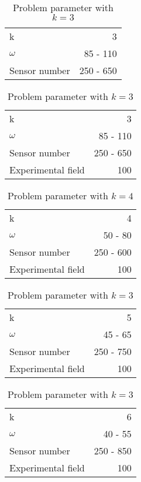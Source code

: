\begin{table}[h!]
	\centering
	\begin{tabular}{l | r}
		k & 3 \\
		$\omega$ & 85 - 110 \\
		Sensor number & 250 - 650 \\
	\end{tabular}
	\caption{Problem parameter with $k = 3$}
\end{table}

\begin{table}[h!]
	\centering
	\begin{tabular}{l | r}
		k & 3 \\
		$\omega$ & 85 - 110 \\
		Sensor number & 250 - 650 \\
		Experimental field & 100
	\end{tabular}
	\caption{Problem parameter with $k = 3$}
\end{table}

\begin{table}[h!]
	\centering
	\begin{tabular}{l | r}
		k & 4 \\
		$\omega$ & 50 - 80 \\
		Sensor number & 250 - 600 \\
		Experimental field & 100
	\end{tabular}
	\caption{Problem parameter with $k = 4$}
\end{table}

\begin{table}[h!]
	\centering
	\begin{tabular}{l | r}
		k & 5 \\
		$\omega$ & 45 - 65 \\
		Sensor number & 250 - 750 \\
		Experimental field & 100
	\end{tabular}
	\caption{Problem parameter with $k = 3$}
\end{table}

\begin{table}[h!]
	\centering
	\begin{tabular}{l | r}
		k & 6 \\
		$\omega$ & 40 - 55 \\
		Sensor number & 250 - 850 \\
		Experimental field & 100
	\end{tabular}
	\caption{Problem parameter with $k = 3$}
\end{table}

